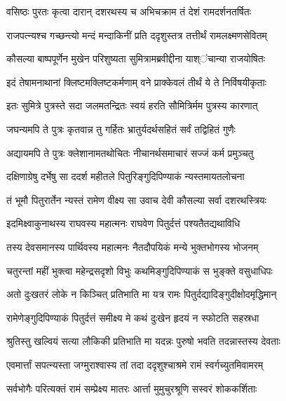 
\twolineshloka
{वसिष्ठः पुरतः कृत्वा दारान् दशरथस्य च}
{अभिचक्राम तं देशं रामदर्शनतर्षितः} %

\twolineshloka
{राजपत्न्यश्च गच्छन्त्यो मन्दं मन्दाकिनीं प्रति}
{ददृशुस्तत्र तत्तीर्थं रामलक्ष्मणसेवितम्} %

\twolineshloka
{कौसल्या बाष्पपूर्णेन मुखेन परिशुष्यता}
{सुमित्रामब्रवीद्दीना याश्ऺचान्या राजयोषितः} %

\twolineshloka
{इदं तेषामनाथानां क्लिष्टमक्लिष्टकर्मणाम्}
{वने प्राक्केवलं तीर्थं ये ते निर्विषयीकृताः} %

\twolineshloka
{इतः सुमित्रे पुत्रस्ते सदा जलमतन्द्रितः}
{स्वयं हरति सौमित्रिर्मम पुत्रस्य कारणात्} %

\twolineshloka
{जघन्यमपि ते पुत्रः कृतवान्न तु गर्हितः}
{भ्रातुर्यदर्थसहितं सर्वं तद्विहितं गुणैः} %

\twolineshloka
{अद्यायमपि ते पुत्रः क्लेशानामतथोचितः}
{नीचानर्थसमाचारं सज्जं कर्म प्रमुञ्चतु} %

\twolineshloka
{दक्षिणाग्रेषु दर्भेषु सा ददर्श महीतले}
{पितुरिङ्गुदिपिण्याकं न्यस्तमायतलोचना} %

\twolineshloka
{तं भूमौ पितुरार्तेन न्यस्तं रामेण वीक्ष्य सा}
{उवाच देवी कौसल्या सर्वा दशरथस्त्रियः} %

\twolineshloka
{इदमिक्ष्वाकुनाथस्य राघवस्य महात्मनः}
{राघवेण पितुर्दत्तं पश्यतैतद्यथाविधि} %

\twolineshloka
{तस्य देवसमानस्य पार्थिवस्य महात्मनः}
{नैतदौपयिकं मन्ये भुक्तभोगस्य भोजनम्} %

\twolineshloka
{चतुरन्तां महीं भुक्त्वा महेन्द्रसदृशो विभुः}
{कथमिङ्गुदिपिण्याकं स भुङ्क्ते वसुधाधिपः} %

\twolineshloka
{अतो दुःखतरं लोके न किञ्चित् प्रतिभाति मा}
{यत्र रामः पितुर्दद्यादिङ्गुदीक्षोदमृद्धिमान्} %

\twolineshloka
{रामेणेङ्गुदिपिण्याकं पितुर्दत्तं समीक्ष्य मे}
{कथं दुःखेन हृदयं न स्फोटति सहस्रधा} %

\twolineshloka
{श्रुतिस्तु खल्वियं सत्या लौकिकी प्रतिभाति मा}
{यदन्नः पुरुषो भवति तदन्नास्तस्य देवताः} %

\twolineshloka
{एवमार्त्तां सपत्न्यस्ता जग्मुराश्वास्य तां तदा}
{ददृशुश्चाश्रमे रामं स्वर्गच्युतमिवामरम्} %

\twolineshloka
{सर्वभोगैः परित्यक्तं रामं सम्प्रेक्ष्य मातरः}
{आर्त्ता मुमुचुरश्रूणि सस्वरं शोककर्शिताः} %

